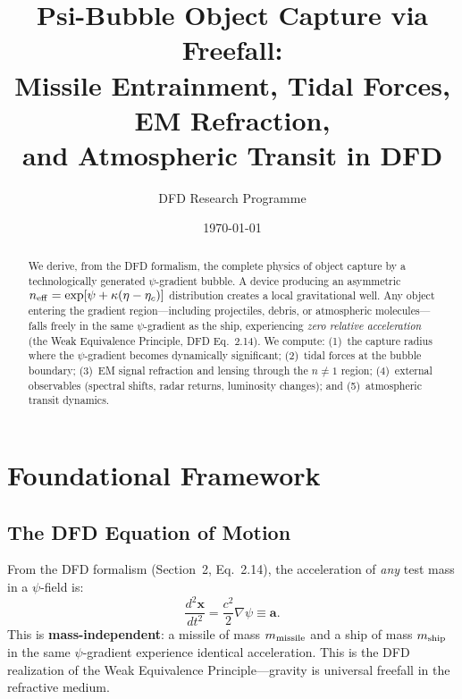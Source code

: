 \documentclass[12pt,aps,prd,superscriptaddress,nofootinbib]{revtex4-2}
\newcommand{\avec}{\mathbf{a}}
\newcommand{\neff}{n_{\rm eff}}
\begin{document}
\title{Psi-Bubble Object Capture via Freefall:\\
Missile Entrainment, Tidal Forces, EM Refraction,\\
and Atmospheric Transit in DFD}

\author{DFD Research Programme}
\date{\today}

\begin{abstract}
We derive, from the DFD formalism, the complete physics of object
capture by a technologically generated $\psi$-gradient bubble.
A device producing an asymmetric $\neff = \exp[\psi + \kappa(\eta - \eta_c)]$
distribution creates a local gravitational well.
Any object entering the gradient region---including projectiles,
debris, or atmospheric molecules---falls freely in the same
$\psi$-gradient as the ship, experiencing \emph{zero relative
acceleration} (the Weak Equivalence Principle, DFD Eq.~2.14).
We compute: (1)~the capture radius where the $\psi$-gradient
becomes dynamically significant; (2)~tidal forces at the bubble
boundary; (3)~EM signal refraction and lensing through the
$n \neq 1$ region; (4)~external observables (spectral shifts,
radar returns, luminosity changes); and (5)~atmospheric transit
dynamics.
\end{abstract}

\maketitle
\tableofcontents

\section{Foundational Framework}\label{sec:foundations}

\subsection{The DFD Equation of Motion}

From the DFD formalism (Section~2, Eq.~2.14), the acceleration of
\emph{any} test mass in a $\psi$-field is:
\begin{equation}
\frac{d^2\mathbf{x}}{dt^2} = \frac{c^2}{2}\nabla\psi \equiv \avec.
\label{eq:eom}
\end{equation}
This is \textbf{mass-independent}: a missile of mass $m_{\rm missile}$
and a ship of mass $m_{\rm ship}$ in the same $\psi$-gradient
experience identical acceleration. This is the DFD realization of the
Weak Equivalence Principle---gravity is universal freefall in the
refractive medium.
\end{document}

